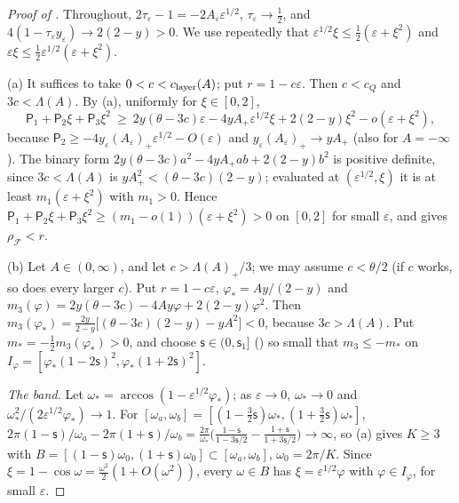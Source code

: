 \documentclass[11pt]{article}
\theoremstyle{definition}
\theoremstyle{remark}
\newcommand{\cF}{\mathcal F}
\newcommand{\sfP}{\mathsf P}
\newcommand{\rhoF}{\rho_{\cF}}
\newcommand{\cQ}{c_{Q}}
\begin{document}
\begin{proof}[Proof of ]
Throughout, \(2\tau_\varepsilon-1=-2A_\varepsilon\varepsilon^{1/2}\), \(\tau_\varepsilon\to\frac12\), and
\(4(1-\tau_\varepsilon y_\varepsilon)\to2(2-y)>0\).  We use repeatedly that
\(\varepsilon^{1/2}\xi\le\frac12(\varepsilon+\xi^2)\) and \(\varepsilon\xi\le\frac12\varepsilon^{1/2}(\varepsilon+\xi^2)\).

(a) It suffices to take \(0<c<c_{\rm layer}(A)\); put \(r=1-c\varepsilon\).  Then \(c<\cQ\) and \(3c<\Lambda(A)\).  By
(a), uniformly for \(\xi\in[0,2]\),
\[
\sfP_1+\sfP_2\xi+\sfP_3\xi^2\ \ge\ 2y(\theta-3c)\varepsilon-4yA_+\varepsilon^{1/2}\xi+2(2-y)\xi^2-o(\varepsilon+\xi^2),
\]
because \(\sfP_2\ge-4y_\varepsilon(A_\varepsilon)_+\varepsilon^{1/2}-O(\varepsilon)\) and \(y_\varepsilon(A_\varepsilon)_+\to yA_+\) (also for
\(A=-\infty\)).  The binary form \(2y(\theta-3c)a^2-4yA_+ab+2(2-y)b^2\) is positive definite,
since \(3c<\Lambda(A)\) is \(yA_+^2<(\theta-3c)(2-y)\); evaluated at \((\varepsilon^{1/2},\xi)\) it is at
least \(m_1(\varepsilon+\xi^2)\) with \(m_1>0\).  Hence \(\sfP_1+\sfP_2\xi+\sfP_3\xi^2\ge(m_1-o(1))(\varepsilon+\xi^2)>0\) on
\([0,2]\) for small \(\varepsilon\), and  gives \(\rhoF<r\).

(b) Let \(A\in(0,\infty)\), and let \(c>\Lambda(A)_+/3\); we may assume \(c<\theta/2\) (if \(c\) works, so does every
larger \(c\)).  Put \(r=1-c\varepsilon\), \(\varphi_*=Ay/(2-y)\) and
\(m_3(\varphi)=2y(\theta-3c)-4Ay\varphi+2(2-y)\varphi^2\).  Then
\(m_3(\varphi_*)=\frac{2y}{2-y}\bigl[(\theta-3c)(2-y)-yA^2\bigr]<0\), because \(3c>\Lambda(A)\).
Put \(m_*=-\frac12m_3(\varphi_*)>0\), and choose
\(\mathsf s\in(0,\mathsf s_1]\) () so small that \(m_3\le-m_*\) on
\(I_\varphi=[\varphi_*(1-2\mathsf s)^2,\varphi_*(1+2\mathsf s)^2]\).

\emph{The band.}  Let \(\omega_*=\arccos(1-\varepsilon^{1/2}\varphi_*)\); as \(\varepsilon\to0\), \(\omega_*\to0\) and
\(\omega_*^2/(2\varepsilon^{1/2}\varphi_*)\to1\).  For \([\omega_a,\omega_b]=[(1-\frac32\mathsf s)\omega_*,(1+\frac32\mathsf s)\omega_*]\),
\(2\pi(1-\mathsf s)/\omega_a-2\pi(1+\mathsf s)/\omega_b=\frac{2\pi}{\omega_*}\bigl(\frac{1-\mathsf s}{1-3\mathsf s/2}-\frac{1+\mathsf s}{1+3\mathsf s/2}\bigr)\to\infty\), so (a) gives \(K\ge3\)
with \(B=[(1-\mathsf s)\omega_0,(1+\mathsf s)\omega_0]\subset[\omega_a,\omega_b]\), \(\omega_0=2\pi/K\).  Since \(\xi=1-\cos\omega=\frac{\omega^2}2(1+O(\omega^2))\), every \(\omega\in B\) has
\(\xi=\varepsilon^{1/2}\varphi\) with \(\varphi\in I_\varphi\), for small \(\varepsilon\).


\end{proof}
\end{document}
